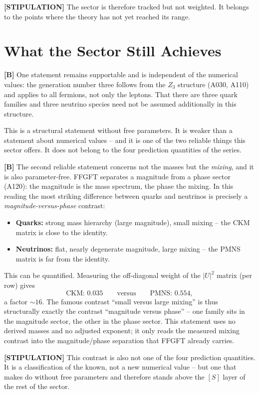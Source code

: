\textbf{[STIPULATION]} The sector is therefore tracked but not weighted. It belongs
to the points where the theory has not yet reached its range.

\section{What the Sector Still Achieves}

\textbf{[B]} One statement remains supportable and is independent of the numerical
values: the generation number three follows from the $Z_3$ structure (A030, A110)
and applies to all fermions, not only the leptons. That there are three quark
families and three neutrino species need not be assumed additionally in this
structure.

This is a structural statement without free parameters. It is weaker than a
statement about numerical values -- and it is one of the two reliable things this
sector offers. It does not belong to the four prediction quantities of the series.

\textbf{[B]} The second reliable statement concerns not the masses but the
\emph{mixing}, and it is also parameter-free. FFGFT separates a magnitude from a
phase sector (A120): the magnitude is the mass spectrum, the phase the mixing. In
this reading the most striking difference between quarks and neutrinos is precisely
a \emph{magnitude-versus-phase} contrast:
\begin{itemize}
  \item \textbf{Quarks:} strong mass hierarchy (large magnitude), small mixing --
    the CKM matrix is close to the identity.
  \item \textbf{Neutrinos:} flat, nearly degenerate magnitude, large mixing --
    the PMNS matrix is far from the identity.
\end{itemize}
This can be quantified. Measuring the off-diagonal weight of the $|U|^2$ matrix
(per row) gives
\[
  \text{CKM: } 0{.}035 \qquad\text{versus}\qquad \text{PMNS: } 0{.}554,
\]
a factor $\sim 16$. The famous contrast ``small versus large mixing'' is thus
structurally exactly the contrast ``magnitude versus phase'' -- one family sits in
the magnitude sector, the other in the phase sector. This statement uses no derived
masses and no adjusted exponent; it only reads the measured mixing contrast into
the magnitude/phase separation that FFGFT already carries.

\textbf{[STIPULATION]} This contrast is also not one of the four prediction quantities.
It is a classification of the known, not a new numerical value -- but one that
makes do without free parameters and therefore stands above the $[S]$ layer of
the rest of the sector.

